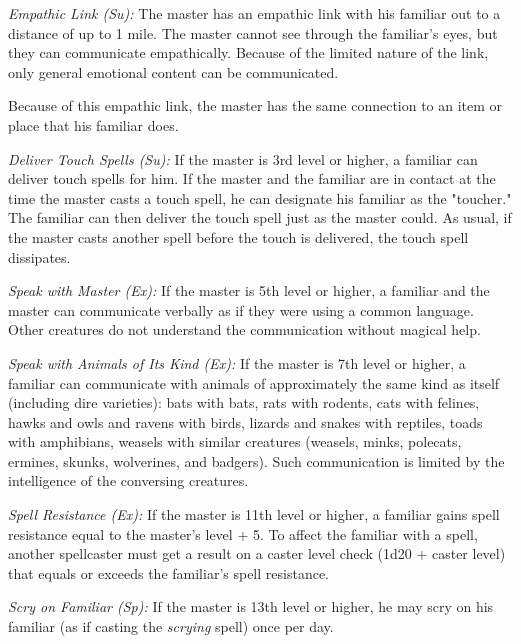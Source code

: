\textit{Empathic Link (Su):} The master has an empathic link with his familiar 
out to a distance of up to 1 mile. The master cannot see through the familiar's 
eyes, but they can communicate empathically. Because of the limited nature of the 
link, only general emotional content can be communicated.

Because of this empathic link, the master has the same connection to an item or 
place that his familiar does.

\textit{Deliver Touch Spells (Su):} If the master is 3rd level or higher, a familiar 
can deliver touch spells for him. If the master and the familiar are in contact 
at the time the master casts a touch spell, he can designate his familiar as the 
"toucher." The familiar can then deliver the touch spell just as the master could. 
As usual, if the master casts another spell before the touch is delivered, the 
touch spell dissipates.

\textit{Speak with Master (Ex):} If the master is 5th level or higher, a familiar 
and the master can communicate verbally as if they were using a common language. 
Other creatures do not understand the communication without magical help.

\textit{Speak with Animals of Its Kind (Ex):} If the master is 7th level or higher, 
a familiar can communicate with animals of approximately the same kind as itself 
(including dire varieties): bats with bats, rats with rodents, cats with felines, 
hawks and owls and ravens with birds, lizards and snakes with reptiles, toads with 
amphibians, weasels with similar creatures (weasels, minks, polecats, ermines, 
skunks, wolverines, and badgers). Such communication is limited by the intelligence 
of the conversing creatures.

\textit{Spell Resistance (Ex):} If the master is 11th level or higher, a familiar 
gains spell resistance equal to the master's level + 5. To affect the familiar 
with a spell, another spellcaster must get a result on a caster level check (1d20 
+ caster level) that equals or exceeds the familiar's spell resistance.

\textit{Scry on Familiar (Sp):} If the master is 13th level or higher, he may scry 
on his familiar (as if casting the \textit{scrying }spell) once per day.


